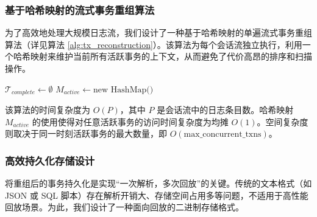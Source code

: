 \subsubsection{基于哈希映射的流式事务重组算法}
为了高效地处理大规模日志流，我们设计了一种基于哈希映射的单遍流式事务重组算法（详见算法 \ref{alg:tx_reconstruction}）。该算法为每个会话流独立执行，利用一个哈希映射来维护当前所有活跃事务的上下文，从而避免了代价高昂的排序和扫描操作。

\begin{algorithm}[H]
    \caption{流式事务重组算法}
    \label{alg:tx_reconstruction}

    
    
    \BlankLine
    $\mathcal{T}_{complete} \leftarrow \emptyset$\;
    $M_{active} \leftarrow \text{new HashMap()}$ 
    
    
    
    \;
\end{algorithm}

该算法的时间复杂度为 $O(P)$，其中 $P$ 是会话流中的日志条目数。哈希映射 $M_{active}$ 的使用使得对任意活跃事务的访问时间复杂度为均摊 $O(1)$。空间复杂度则取决于同一时刻活跃事务的最大数量，即 $O(\text{max\_concurrent\_txns})$。

\subsubsection{高效持久化存储设计}
将重组后的事务持久化是实现“一次解析，多次回放”的关键。传统的文本格式（如 JSON 或 SQL 脚本）存在解析开销大、存储空间占用多等问题，不适用于高性能回放场景。为此，我们设计了一种面向回放的二进制存储格式。

